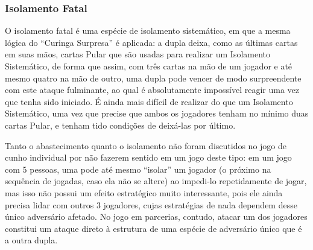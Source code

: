 \subsubsection{Isolamento Fatal}

O isolamento fatal é uma espécie de isolamento sistemático, em que a mesma lógica do ``Curinga Surpresa'' é aplicada: a dupla deixa, como as últimas cartas em suas mãos, cartas Pular que são usadas para realizar um Isolamento Sistemático, de forma que assim, com três cartas na mão de um jogador e até mesmo quatro na mão de outro, uma dupla pode vencer de modo surpreendente com este ataque fulminante, ao qual é absolutamente impossível reagir uma vez que tenha sido iniciado. É ainda mais difícil de realizar do que um Isolamento Sistemático, uma vez que precise que ambos os jogadores tenham no mínimo duas cartas Pular, e tenham tido condições de deixá-las por último.

Tanto o abastecimento quanto o isolamento não foram discutidos no jogo de cunho individual por não fazerem sentido em um jogo deste tipo: em um jogo com 5 pessoas, uma pode até mesmo ``isolar'' um jogador (o próximo na sequência de jogadas, caso ela não se altere) ao impedi-lo repetidamente de jogar, mas isso não possui um efeito estratégico muito interessante, pois ele ainda precisa lidar com outros 3 jogadores, cujas estratégias de nada dependem desse único adversário afetado. No jogo em parcerias, contudo, atacar um dos jogadores constitui um ataque direto à estrutura de uma espécie de adversário único que é a outra dupla.